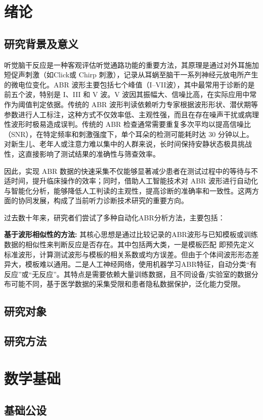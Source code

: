 \chapter{绪论}

\section{研究背景及意义}
听觉脑干反应是一种客观评估听觉通路功能的重要方法，其原理是通过对外耳施加短促声刺激（如Click或 Chirp 刺激），记录从耳蜗至脑干一系列神经元放电所产生的微电位变化。ABR 波形主要包括七个峰值（I–VII波），其中最常用于诊断的是前五个波，特别是 I、III 和 V 波。V 波因其振幅大、信噪比高，在实际应用中常作为阈值判定依据。传统的 ABR 波形判读依赖听力专家根据波形形状、潜伏期等参数进行人工标注，这种方式不仅效率低、主观性强，而且在存在噪声干扰或病理性波形时极易造成误判。传统的 ABR 检查通常需要重复多次平均以提高信噪比（SNR），在特定频率和刺激强度下，单个耳朵的检测可能耗时达 30 分钟以上。对新生儿、老年人或注意力难以集中的人群来说，长时间保持安静状态极具挑战性，这直接影响了测试结果的准确性与筛查效率。

因此，实现 ABR 数据的快速采集不仅能够显著减少患者在测试过程中的等待与不适时间，提升临床操作的效率；同时，借助人工智能技术对 ABR 波形进行自动化与智能化分析，能够降低人工判读的主观性，提高诊断的准确率和一致性。这两方面的协同发展，构成了当前听力诊断技术研究的重要方向。

过去数十年来，研究者们尝试了多种自动化ABR分析方法，主要包括：

\textbf{基于波形相似性的方法:}
其核心思想是通过比较记录的ABR波形与已知模板或训练数据的相似性来判断反应是否存在。其中包括两大类，一是模板匹配\cite{valderrama2014} 即预先定义标准波形，计算测试波形与模板的相关系数或均方误差。但由于个体间波形形态差异大，模板难以通用。二是人工神经网络，使用机器学习ABR特征，自动分类“有反应”或“无反应”。其特点是需要依赖大量训练数据，且不同设备/实验室的数据分布可能不同，基于医学数据的采集受限和患者隐私数据保护，泛化能力受限。
\section{研究对象}

\section{研究方法}

\chapter{数学基础}

\section{基础公设}